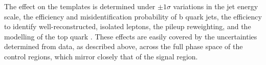 The effect on the \HTmiss templates is determined under $\pm1\sigma$
variations in the jet energy scale, the efficiency and
misidentification probability of b quark jets, the efficiency to
identify well-reconstructed, isolated leptons, the pileup reweighting,
and the modelling of the top quark \Pt. These effects
are easily covered by the uncertainties determined from data, as
described above, across the full phase space of the control regions,
which mirror closely that of the signal region.







